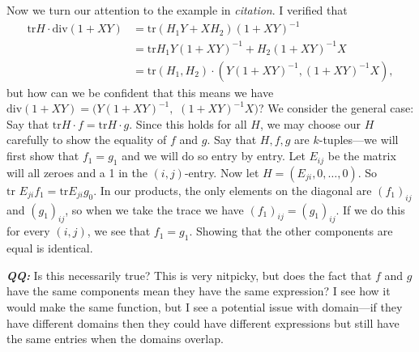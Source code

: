 \documentclass[12pt]{exam}
\begin{document}
\noindent Now we turn our attention to the example in \emph{citation}. I verified that
\begin{align*}
  \text{tr} H \cdot \text{div} \left( 1+XY \right)
    &= \text{tr} \left( H_1 Y+X H_2 \right)(1+XY) ^{-1}\\
    &= \text{tr} H_1Y(1+XY) ^{-1} + H_2(1+XY) ^{-1} X \\
    &= \text{tr} \left( H_1,H_2 \right) \cdot \left( Y(1+XY) ^{-1} , \left( 1+XY \right) ^{-1}X \right),
\end{align*}
but how can we be confident that this means we have
$\text{div} \left( 1+XY \right) = ( Y(1+XY) ^{-1} ,$ $ \left( 1+XY \right) ^{-1}X)$?
We consider the general case: Say that
$\text{tr} H \cdot f = \text{tr} H \cdot g$. Since this holds for all $H$, we
may choose our $H$ carefully to show the equality of $f$ and $g$. Say that $H,f,g$
are $k$-tuples---we will first show that $f_1=g_1$ and we will do so entry by
entry. Let $E_{ij}$ be the matrix will all zeroes and a 1 in the $(i,j)$-entry.
Now let $H= (E_{ji},0, \dots ,0)$. So $\text{tr } E_{ji}f_1 = \text{tr
} E_{ji}g_0$. In our products, the only elements on the diagonal are
$(f_1)_{ij}$ and $(g_1)_{ij}$, so when we take the trace we have
$(f_1)_{ij} =(g_1)_{ij}$. If we do this for every $(i,j)$, we see that
$f_1=g_1$. Showing that the other components are equal is identical.

\emph{\bf QQ:} Is this necessarily true? This is very nitpicky, but does the fact
that $f$ and $g$ have the same components mean they have the same expression? I
see how it would make the same function, but I see a potential issue with
domain---if they have different domains then they could have different
expressions but still have the same entries when the domains overlap.
\end{document}
